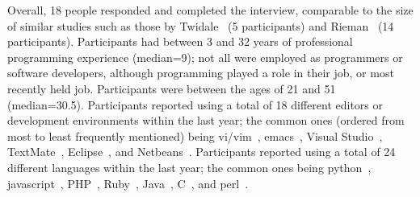 \documentclass[smallextended]{svjour3}
\begin{document}
Overall, 18 people responded and completed the interview, comparable to the
size of similar studies such as those by Twidale~\citeyearpar{twidale05} (5 participants)
and Rieman~\citeyearpar{rieman} (14 participants).
Participants had between 3 and 32 years of professional programming experience (median=9);
not all were employed as programmers or software developers,
although programming played a role in their job, or most recently held job. 
Participants were between the ages of 21 and 51 (median=30.5). 
Participants reported using a total of 18 different editors or development
environments within the last year; the common ones (ordered from
most to least frequently mentioned) being vi/vim~\citeyearpar{vim}, emacs~\citeyearpar{emacs},
Visual Studio~\citeyearpar{visualstudio}, TextMate~\citeyearpar{textmate}, Eclipse~\citeyearpar{eclipse}, and
Netbeans~\citeyearpar{netbeans}. 
Participants reported using a total of 24 different languages within the last year;
the common ones being python~\citeyearpar{python}, javascript~\citeyearpar{javascript}, PHP~\citeyearpar{php}, 
Ruby~\citeyearpar{ruby}, Java~\citeyearpar{java}, C~\citeyearpar{c}, and perl~\citeyearpar{perl}.

   	\newcommand\catA{\Circle\xspace}
   	\newcommand\catB{\LEFTCIRCLE\xspace}
   	\newcommand\catC{\CIRCLE\xspace}
   	
   	\newcommand\catLess{$-$\xspace}
   	\newcommand\catEq{$\approx$\xspace}
   	\newcommand\catMore{$+$\xspace}
\end{document}
